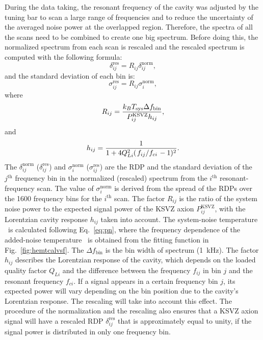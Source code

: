 During the data taking, the resonant frequency of the cavity was  
adjusted by the tuning bar to scan a large range of frequencies and to 
reduce the uncertainty of the averaged noise power at the overlapped region. 
Therefore, the 
spectra of all the scans need to be combined to create one big spectrum. 
Before doing this, the normalized spectrum from each scan is rescaled and 
the rescaled spectrum is computed with the following formula:
\begin{equation}
  \label{eq:respower_eqn}
  \delta_{ij}^\text{res} = R_{ij}\delta_{ij}^\text{norm},
\end{equation}
and the standard deviation of each bin is:
\begin{equation}
  \label{eq:ressigma_eqn}
  \sigma_{ij}^\text{res} = R_{ij}\sigma_{i}^\text{norm},
\end{equation}
where 
 \begin{equation}
 R_{ij} = \frac{k_{B}T_\text{sys} \Delta f_\text{bin} }{P_{ij}^\text{KSVZ} h_{ij}}, 
 \label{eq:Rratio}
 \end{equation}
and 
 \begin{equation}
 h_{ij} = \frac{1}{1 + 4Q_{Li}^{2}(\left.f_{ij}\middle/f_{ci}\right.-1)^2}. 
 \label{eq:Lorentz}
 \end{equation}
The $\delta_{ij}^\text{norm}$ ($\delta_{ij}^\text{res}$) and 
$\sigma_{i}^\text{norm}$ ($\sigma_{ij}^\text{res}$) are the 
RDP and the standard deviation of the $j^\text{th}$ frequency bin in 
the normalized (rescaled) spectrum from the 
$i^\text{th}$ resonant-frequency scan. 
The value of $\sigma_{i}^\text{norm}$ is derived from the spread of the 
RDPs over the 1600 frequency bins for the $i^\text{th}$ scan. 
The factor $R_{ij}$ is the ratio of 
the system noise power to the expected signal power of the KSVZ axion 
$P_{ij}^\text{KSVZ}$, with the Lorentzian cavity response $h_{ij}$ 
taken into account. 
The system-noise temperature \tsys\ is calculated following Eq.~\eqref{eq:pn},
 where the frequency dependence of the added-noise temperature \ta\ is 
obtained from the fitting function in Fig.~\ref{fig:hemtcalvsf}. 
The $\Delta f_\text{bin}$ is the bin width of spectrum (1~kHz). 
The factor $h_{ij}$ describes the Lorentzian response of the cavity, 
which depends on the loaded quality factor $Q_{Li}$ and the 
difference between the frequency $f_{ij}$ in bin $j$ and the resonant 
frequency $f_{ci}$. 
%
If a signal appears in a certain frequency bin $j$, its expected power 
will vary depending on the bin position due to the cavity's 
Lorentzian response. The rescaling will take into account this effect. 
The procedure of the normalization and the rescaling also ensures that a 
KSVZ axion signal will have a rescaled RDP $\delta_{ij}^\text{res}$ 
that is approximately equal to unity, if the signal power is distributed 
in only one frequency bin. 


